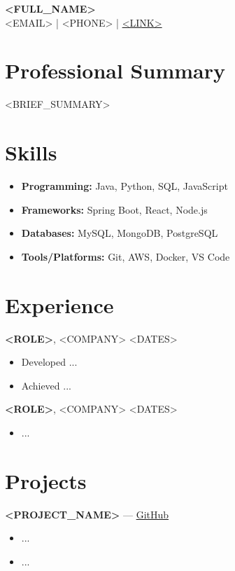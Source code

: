 \documentclass[11pt]{article}
\begin{document}
\begin{center}
    {\LARGE \textbf{<FULL_NAME>}} \\
    <EMAIL> \quad | \quad <PHONE> \quad | \quad \href{<LINK>}{<LINK>} \\
\end{center}

\vspace{0.5em}

\section*{Professional Summary}
<BRIEF_SUMMARY>

\section*{Skills}
\begin{itemize}
    \item \textbf{Programming:} Java, Python, SQL, JavaScript
    \item \textbf{Frameworks:} Spring Boot, React, Node.js
    \item \textbf{Databases:} MySQL, MongoDB, PostgreSQL
    \item \textbf{Tools/Platforms:} Git, AWS, Docker, VS Code
\end{itemize}

\section*{Experience}
\textbf{<ROLE>}, <COMPANY> \hfill <DATES> \\
\begin{itemize}
    \item Developed ...
    \item Achieved ...
\end{itemize}

\textbf{<ROLE>}, <COMPANY> \hfill <DATES> \\
\begin{itemize}
    \item ...
\end{itemize}

\section*{Projects}
\textbf{<PROJECT_NAME>} — \href{<GITHUB_LINK>}{GitHub} \\
\begin{itemize}
    \item ...
    \item ...
\end{itemize}
\end{document}
